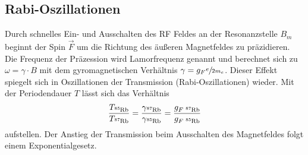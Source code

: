\subsection{Rabi-Oszillationen}
Durch schnelles Ein- und Ausschalten des RF Feldes an der Resonanzstelle $B_m$ beginnt der Spin $\vec{F}$ um die Richtung des äußeren Magnetfeldes zu 
präzidieren. Die Frequenz der Präzession wird Lamorfrequenz genannt und berechnet sich zu $\omega = \gamma \cdot B$ mit dem gyromagnetischen Verhältnis 
$\gamma = g_F \sfrac{e}{2m_e}$. Dieser Effekt spiegelt sich in Oszillationen der Transmission (Rabi-Oszillationen) wieder. Mit der Periodendauer $T$ lässt sich 
das Verhältnis
\begin{equation}
    \label{eq:Rabi}
    \frac{T_{\ce{^{85}Rb}}}{T_{\ce{^{87}Rb}}} = \frac{\gamma_{\ce{^{87}Rb}}}{\gamma_{\ce{^{85}Rb}}} = \frac{g_{F \;{\ce{^{87}Rb}}}}{g_{F \;{\ce{^{85}Rb}}}}
\end{equation}
aufstellen.
Der Anstieg der Transmission beim Ausschalten des Magnetfeldes folgt einem Exponentialgesetz.
